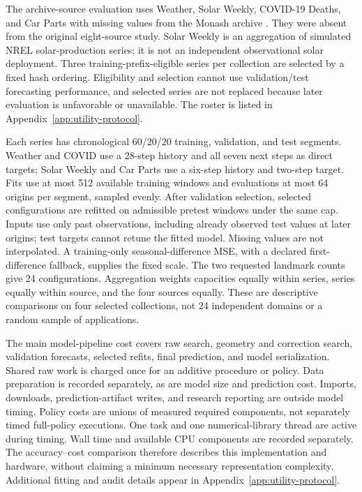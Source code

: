 The archive-source evaluation uses Weather, Solar Weekly, COVID-19 Deaths,
and Car Parts with missing values from the Monash archive
\citep{Godahewa2021Monash,Godahewa2020Weather,Godahewa2020SolarWeekly,
Godahewa2020CovidDeaths,Godahewa2020CarPartsMissing}. They were absent
from the original eight-source study. Solar Weekly is an aggregation
of simulated NREL solar-production series; it is not an independent
observational solar deployment. Three training-prefix-eligible series
per collection are selected by a fixed hash ordering. Eligibility and
selection cannot use validation/test forecasting performance, and selected
series are not replaced because later evaluation is unfavorable or
unavailable. The roster is listed in Appendix~\ref{app:utility-protocol}.

Each series has chronological 60/20/20 training, validation, and test
segments. Weather and COVID use a 28-step history and all seven next
steps as direct targets; Solar Weekly and Car Parts use a six-step
history and two-step target. Fits use at most 512 available training
windows and evaluations at most 64 origins per segment, sampled evenly.
After validation selection, selected configurations are refitted on
admissible pretest windows under the same cap. Inputs use only past
observations, including already observed test values at later origins;
test targets cannot retune the fitted model. Missing values are not
interpolated. A training-only seasonal-difference MSE, with a declared
first-difference fallback, supplies the fixed scale. The two requested landmark
counts give 24 configurations. Aggregation weights capacities equally
within series, series equally within source, and the four sources equally.
These are descriptive comparisons on four selected collections, not
24 independent domains or a random sample of applications.

The main model-pipeline cost covers raw search, geometry and correction
search, validation forecasts, selected refits, final prediction, and model
serialization. Shared raw work is charged once for an additive procedure
or policy. Data preparation is recorded separately, as are model size and
prediction cost. Imports, downloads, prediction-artifact writes, and
research reporting are outside model timing. Policy costs are unions of
measured required components, not separately timed full-policy executions.
One task and one numerical-library
thread are active during timing. Wall time and available CPU components
are recorded separately. The accuracy--cost comparison therefore
describes this implementation and hardware, without claiming a minimum
necessary representation complexity. Additional fitting and audit details
appear in Appendix~\ref{app:utility-protocol}.

